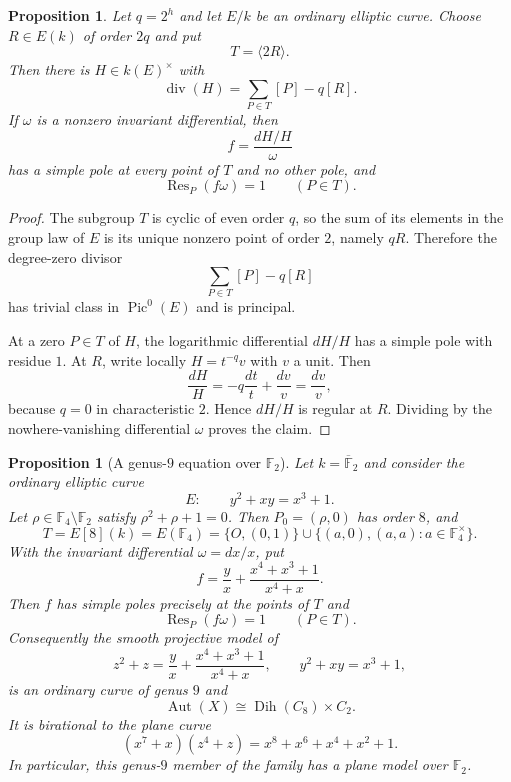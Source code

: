 \documentclass[11pt]{article}
\newtheorem{proposition}[theorem]{Proposition}
\theoremstyle{remark}
\newcommand{\Aut}{\operatorname{Aut}}
\newcommand{\Res}{\operatorname{Res}}
\newcommand{\Pic}{\operatorname{Pic}}
\newcommand{\Dih}{\operatorname{Dih}}
\newcommand{\F}{\mathbb F}
\begin{document}
\begin{proposition}\label{prop:logdiff}
Let $q=2^h$ and let $E/k$ be an ordinary elliptic curve.  Choose
$R\in E(k)$ of order $2q$ and put
\[
 T=\langle 2R\rangle.
\]
Then there is $H\in k(E)^\times$ with
\[
 \operatorname{div}(H)=\sum_{P\in T}[P]-q[R].
\]
If $\omega$ is a nonzero invariant differential, then
\[
 f=\frac{dH/H}{\omega}
\]
has a simple pole at every point of $T$ and no other pole, and
\[
 \Res_P(f\omega)=1\qquad(P\in T).
\]
\end{proposition}

\begin{proof}
The subgroup $T$ is cyclic of even order $q$, so the sum of its elements
in the group law of $E$ is its unique nonzero point of order $2$, namely
$qR$.  Therefore the degree-zero divisor
\[
 \sum_{P\in T}[P]-q[R]
\]
has trivial class in $\Pic^0(E)$ and is principal.

At a zero $P\in T$ of $H$, the logarithmic differential $dH/H$ has a
simple pole with residue $1$.  At $R$, write locally $H=t^{-q}v$ with
$v$ a unit.  Then
\[
 \frac{dH}{H}=-q\frac{dt}{t}+\frac{dv}{v}=\frac{dv}{v},
\]
because $q=0$ in characteristic $2$.  Hence $dH/H$ is regular at $R$.
Dividing by the nowhere-vanishing differential $\omega$ proves the
claim.
\end{proof}


\begin{proposition}[A genus-$9$ equation over $\F_2$]\label{prop:explicit9}
Let $k=\overline{\F}_2$ and consider the ordinary elliptic curve
\[
 E:\qquad y^2+xy=x^3+1.
\]
Let $\rho\in\F_4\setminus\F_2$ satisfy $\rho^2+\rho+1=0$.  Then
$P_0=(\rho,0)$ has order $8$, and
\[
 T=E[8](k)=E(\F_4)
 =\{O,(0,1)\}\cup
   \{(a,0),(a,a):a\in\F_4^\times\}.
\]
With the invariant differential $\omega=dx/x$, put
\begin{equation}\label{eq:explicit-f9}
 f=\frac{y}{x}+\frac{x^4+x^3+1}{x^4+x}.
\end{equation}
Then $f$ has simple poles precisely at the points of $T$ and
\[
 \Res_P(f\omega)=1\qquad(P\in T).
\]
Consequently the smooth projective model of
\begin{equation}\label{eq:explicit-AS9}
 z^2+z=\frac{y}{x}+\frac{x^4+x^3+1}{x^4+x},
 \qquad y^2+xy=x^3+1,
\end{equation}
is an ordinary curve of genus $9$ and
\[
 \Aut(X)\cong \Dih(C_8)\times C_2.
\]
It is birational to the plane curve
\begin{equation}\label{eq:explicit-plane9}
 \boxed{(x^7+x)(z^4+z)=x^8+x^6+x^4+x^2+1}.
\end{equation}
In particular, this genus-$9$ member of the family has a plane model over
$\F_2$.
\end{proposition}
\end{document}
